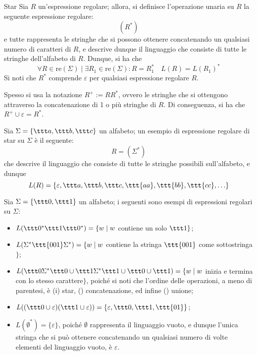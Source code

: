 \documentclass[a4paper, 12pt]{report}
\begin{document}
    \begin{frameddefn}{Star}
        Sia $R$ un'espressione regolare; allora, si definisce l'operazione unaria  su $R$ la seguente espressione regolare: $$(R^*)$$ e tutte rappresenta le stringhe che si possono ottenere concatenando un qualsiasi numero di caratteri di $R$, e descrive dunque il linguaggio che consiste di tutte le stringhe dell'alfabeto di $R$. Dunque, si ha che $$\forall R \in \mathrm{re}(\Sigma) \mid \exists R_1 \in \mathrm{re}(\Sigma) : R = R_1^* \quad L(R) = L(R_1)^*$$ Si noti che $R^*$ comprende $\varepsilon$ per qualsiasi espressione regolare $R$.

        Spesso si usa la notazione $R^+ := RR^*$, ovvero le stringhe che si ottengono attraverso la concatenazione di 1 o più stringhe di $R$. Di conseguenza, si ha che $R^+ \cup \varepsilon = R^*$.
    \end{frameddefn}

    \begin{example}[Star]
        Sia $\Sigma = \{\ttt a, \ttt b, \ttt c\}$ un alfabeto; un esempio di espressione regolare di star su $\Sigma$ è il seguente: $$R = (\Sigma^*)$$ che descrive il linguaggio che consiste di tutte le stringhe possibili sull'alfabeto, e dunque $$L(R) = \{\varepsilon, \ttt a, \ttt b, \ttt c, \ttt{aa}, \ttt{bb}, \ttt{cc}, \ldots\}$$
    \end{example}

    \begin{example}
        Sia $\Sigma = \{\ttt 0, \ttt 1\}$ un alfabeto; i seguenti sono esempi di espressioni regolari su $\Sigma$:
        
        \begin{itemize}
            \item $L(\ttt 0 ^* \ttt 1 \ttt 0 ^*) = \{w \mid w$ contiene un solo $\ttt 1 \}$;
            \item $L(\Sigma ^* \ttt{001} \Sigma ^*) = \{ w \mid w$ contiene la stringa $\ttt{001}$ come sottostringa$\}$;
            \item $L(\ttt 0 \Sigma ^* \ttt 0 \cup \ttt 1 \Sigma ^* \ttt 1 \cup \ttt 0 \cup \ttt 1) = \{w \mid w$ inizia e termina con lo stesso carattere$\}$, poiché si noti che l'ordine delle operazioni, a meno di parentesi, è (\tit i) star, () concatenazione, ed infine () unione;
            \item $L((\ttt 0 \cup \varepsilon) (\ttt 1 \cup \varepsilon)) = \{\varepsilon, \ttt 0, \ttt 1, \ttt{01}\}$;
            \item $L(\emptyset ^*) = \{ \varepsilon \}$, poiché $\emptyset$ rappresenta il linguaggio vuoto, e dunque l'unica stringa che si può ottenere concatenando un qualsiasi numero di volte elementi del linguaggio vuoto, è $\varepsilon$.
        \end{itemize}
    \end{example}
\end{document}
